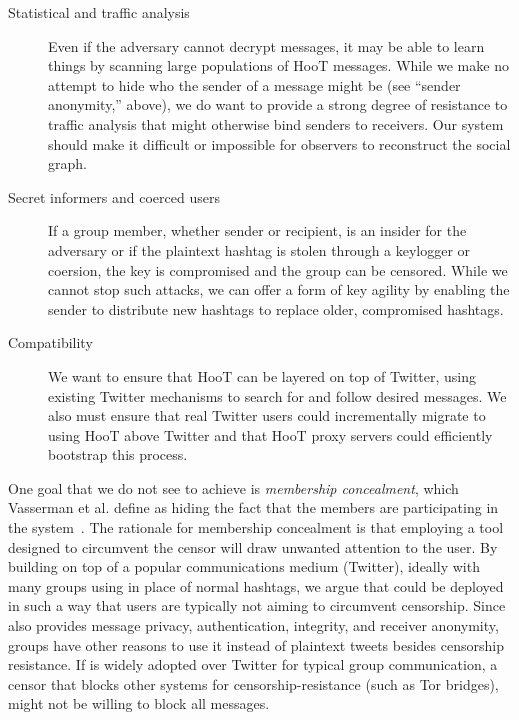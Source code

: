 \begin{description}
\item[Statistical and traffic analysis] Even if the adversary cannot
  decrypt messages, it may be able to learn things by scanning large
  populations of HooT messages. While we make no attempt to hide who the
  sender of a message might be (see ``sender anonymity,'' above), we do
  want to provide a strong degree of resistance to traffic analysis that
  might otherwise bind senders to receivers. Our system should make it
  difficult or impossible for observers to reconstruct the social graph.

\item[Secret informers and coerced users] If a group member, whether
  sender or recipient, is an insider for the adversary or if the
  plaintext hashtag is stolen through a keylogger or coersion, the key
  is compromised and the group can be censored. While we cannot stop
  such attacks, we can offer a form of key agility by enabling the
  sender to distribute new hashtags to replace older, compromised
  hashtags.

\item[Compatibility] We want to ensure that HooT can be layered on top
  of Twitter, using existing Twitter mechanisms to search for and follow
  desired messages. We also must ensure that real Twitter users could
  incrementally migrate to using HooT above Twitter and that HooT proxy
  servers could efficiently bootstrap this process.

\end{description}

One goal that we do not see to achieve is {\em membership concealment},
which Vasserman et al. define as hiding the fact that the members are
participating in the system~\cite{vasserman09mcon}. The rationale for
membership concealment is that employing a tool designed to circumvent
the censor will draw unwanted attention to the user. By building \hoot
on top of a popular communications medium (Twitter), ideally with many
groups using \hoot in place of normal hashtags, we argue that \hoot
could be deployed in such a way that users are typically not aiming to
circumvent censorship. Since \hoot also provides message privacy,
authentication, integrity, and receiver anonymity, groups have other
reasons to use it instead of plaintext tweets besides censorship
resistance. If \hoot is widely adopted over Twitter for typical group
communication, a censor that blocks other systems for
censorship-resistance (such as Tor bridges), might not be willing to
block all \hoot messages. 

